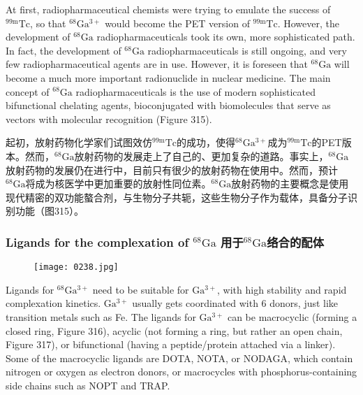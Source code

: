 \documentclass[dvipsnames, svgnames,a4paper,11pt]{article}
\begin{document}
At first, radiopharmaceutical chemists were trying to emulate the success of \(\mathrm{^{99m}Tc}\), so that \(\mathrm{^{68}Ga^{3+}}\) would become the PET version of \(\mathrm{^{99m}Tc}\). However, the development of \(\mathrm{^{68}Ga}\) radiopharmaceuticals took its own, more sophisticated path. In fact, the development of \(\mathrm{^{68}Ga}\) radiopharmaceuticals is still ongoing, and very few radiopharmaceutical agents are in use. However, it is foreseen that \(\mathrm{^{68}Ga}\) will become a much more important radionuclide in nuclear medicine. The main concept of \(\mathrm{^{68}Ga}\) radiopharmaceuticals is the use of modern sophisticated bifunctional chelating agents, bioconjugated with biomolecules that serve as vectors with molecular recognition (Figure 315).

起初，放射药物化学家们试图效仿\(\mathrm{^{99m}Tc}\)的成功，使得\(\mathrm{^{68}Ga^{3+}}\)成为\(\mathrm{^{99m}Tc}\)的PET版本。然而，\(\mathrm{^{68}Ga}\)放射药物的发展走上了自己的、更加复杂的道路。事实上，\(\mathrm{^{68}Ga}\)放射药物的发展仍在进行中，目前只有很少的放射药物在使用中。然而，预计\(\mathrm{^{68}Ga}\)将成为核医学中更加重要的放射性同位素。\(\mathrm{^{68}Ga}\)放射药物的主要概念是使用现代精密的双功能螯合剂，与生物分子共轭，这些生物分子作为载体，具备分子识别功能（图315）。



\subsubsection{Ligands for the complexation of \(\mathrm{^{68}Ga}\) 用于\(\mathrm{^{68}Ga}\)络合的配体}  

\begin{figure}[h]
	\centering
    \texttt{[image: 0238.jpg]}  
     \label{fig316}
\end{figure}

Ligands for \(\mathrm{^{68}Ga^{3+}}\) need to be suitable for \(\mathrm{Ga^{3+}}\), with high stability and rapid complexation kinetics. \(\mathrm{Ga^{3+}}\) usually gets coordinated with 6 donors, just like transition metals such as Fe. The ligands for \(\mathrm{Ga^{3+}}\) can be macrocyclic (forming a closed ring, Figure 316), acyclic (not forming a ring, but rather an open chain, Figure 317), or bifunctional (having a peptide/protein attached via a linker). Some of the macrocyclic ligands are DOTA, NOTA, or NODAGA, which contain nitrogen or oxygen as electron donors, or macrocycles with phosphorus-containing side chains such as NOPT and TRAP.
\end{document}
